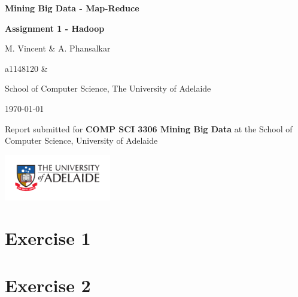 \documentclass[12t]{article}
\begin{document}
 	\newcommand{\titlestr}{Mining Big Data - Map-Reduce}
 	\newcommand{\shorttitlestr}{Assignment 1 - Hadoop}
 	\newcommand{\groupnames}{M. Vincent \& A. Phansalkar}
 	\newcommand{\studentids}{a1148120 \& }
 	\newcommand{\authorstr}{\groupnames}
 	
 	\begin{titlepage}
 		\centering
 		
 		{\LARGE \bf \titlestr \par}
 		\vspace{0.25cm}
 		{\large \bf \shorttitlestr \par}
 		
 		
 		\vspace{1cm}
 		{\large \authorstr \\}
 		{ \studentids \par}
 		\vspace{0.25cm}
 		
 		\large School of Computer Science, The University of Adelaide
 		
 		\vspace{1cm}
 		\today
 		
 		\vspace{3cm}
 		Report submitted for
 		{\bf COMP SCI 3306 Mining Big Data}
 		at the School of Computer Science,
 		University of Adelaide
 		
 		\includegraphics[width=0.35\textwidth]{./Figures/UoA_logo_cmyk.pdf}
 		
 		\vspace{9cm}
 		

 	 	\vspace{1mm}
 		\noindent \hrulefill
 		
 		\vfill
 	\end{titlepage}
 	
 	\clearpage
 	\setcounter{page}{1}
	
	\section*{Exercise 1}
	

	
	\section*{Exercise 2}
\end{document}
